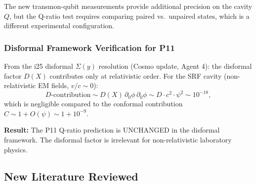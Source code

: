 \documentclass[11pt]{article}
\begin{document}
The new transmon-qubit measurements provide additional precision
on the cavity $Q$, but the Q-ratio test requires comparing paired
vs.\ unpaired states, which is a different experimental configuration.

\subsubsection{Disformal Framework Verification for P11}

From the i25 disformal $\Sigma(y)$ resolution (Cosmo update, Agent 4):
the disformal factor $D(X)$ contributes only at relativistic order.
For the SRF cavity (non-relativistic EM fields, $v/c \sim 0$):
\begin{equation}
  D\text{-contribution} \sim D(X)\,\partial_0\phi\,\partial_0\phi
  \sim D \cdot c^2 \cdot \psi^2 \sim 10^{-18},
\end{equation}
which is negligible compared to the conformal contribution
$C \sim 1 + O(\psi) \sim 1 + 10^{-9}$.

\textbf{Result:} The P11 Q-ratio prediction is UNCHANGED in the
disformal framework. The disformal factor is irrelevant for
non-relativistic laboratory physics.

\subsection{New Literature Reviewed}
\end{document}
